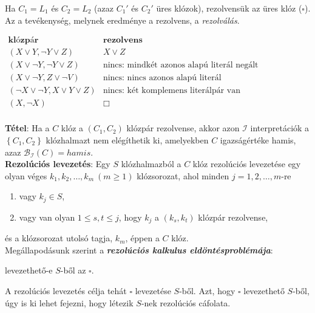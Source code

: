 \documentclass[tikz,12pt,margin=0px]{article}
\begin{document}
    \noindent Ha $C_{1} = L_{1}$ és $C_{2} = L_{2}$ (azaz $C_{1}'$ és $C_{2}'$ üres klózok), rezolvensük az üres klóz ($\square$).\\
    Az a tevékenység, melynek eredménye a rezolvens, a \textit{rezolválás}.
	\begin{center}
        $\begin{array}{r|l}
            \textbf{klózpár} & \textbf{rezolvens} \\ \hline
            (X \vee Y,\neg Y \vee Z) & X \vee Z \\
            (X \vee \neg Y, \neg Y \vee Z) & \text{nincs: mindkét azonos alapú literál negált} \\
            (X \vee \neg Y, Z \vee \neg V) & \text{nincs: nincs azonos alapú literál} \\
            (\neg X \vee \neg Y, X \vee Y \vee Z) & \text{nincs: két komplemens literálpár van} \\
            (X, \neg X) & \Box \\
        \end{array}$
    \end{center}
	
	\noindent \textbf{Tétel}: Ha a $C$ klóz a $(C_{1},C_{2})$ klózpár rezolvense, akkor azon $\mathcal{I}$ interpretációk
	a $\left\{C_{1}, C_{2}\right\}$ klózhalmazt nem elégíthetik ki, amelyekben $C$ igazságértéke hamis, azaz
	$\mathcal{B}_{\mathcal{I}}(C) = hamis$.\\
\newpage	
	\noindent \textbf{Rezolúciós levezetés}: Egy $S$ klózhalmazból a $C$ klóz rezolúciós levezetése egy olyan véges
	$k_{1}, k_{2}, \ldots ,k_{m}\ (m \geq 1)$ klózsorozat, ahol minden $j = 1, 2, \ldots, m$-re
	
	\begin{enumerate}
		\item	vagy $k_{j} \in S$,
		\item	vagy van olyan $1 \leq s,t \le j$, hogy $k_{j}$ a $(k_{s}, k_{t})$ klózpár rezolvense,
	\end{enumerate}
	\noindent és a klózsorozat utolsó tagja, $k_{m}$, éppen a $C$ klóz.\\
	
    \noindent Megállapodásunk szerint a \textbf{\emph{rezolúciós kalkulus eldöntésproblémája}}:
    \begin{center}
        levezethető-e $S$-ből az $\square$.
    \end{center}

    \noindent A rezolúciós levezetés célja tehát $\square$ levezetése $S$-ből. Azt, hogy $\square$ levezethető $S$-ből, úgy is ki lehet fejezni, hogy létezik $S$-nek rezolúciós cáfolata.\\
	
\end{document}
